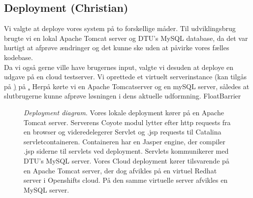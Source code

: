 \subsection*{Deployment (Christian)}
Vi valgte at deploye vores system på to forskellige måder. Til udviklingsbrug
brugte vi en lokal Apache Tomcat server og DTU's MySQL database, da det var
hurtigt at afprøve ændringer og det kunne ske uden at påvirke vores fælles
kodebase.\\
Da vi også gerne ville have brugernes input, valgte vi desuden at deploye en
udgave på en cloud testserver. Vi oprettede et virtuelt serverinstance (kan
tilgås på \href{http://rtgrek-area51.rhcloud.com/}) på \href{www.openshift.com}.
Herpå kørte vi en Apache Tomcatserver og en mySQL server, således at
slutbrugerne kunne afprøve løsningen i dens aktuelle udformning.
FloatBarrier
\begin{figure}[h]
\centering
{}
\caption{\emph{Deployment diagram}. Vores lokale deployment kører på en Apache
Tomcat server. Serverens Coyote modul lytter efter http requests fra en browser
og videredelegerer Servlet og .jsp requests til Catalina servletcontaineren.
Containeren har en Jasper engine, der compiler .jsp siderne til servlets ved
deployment. Servlets kommunikerer med DTU's MySQL server. Vores Cloud deployment
kører tilsvarende på en Apache Tomcat server, der dog afvikles på en virtuel
Redhat server i Openshifts cloud. På den samme virtuelle server afvikles en
MySQL server. \label{deployment_diagram}}
\end{figure}
\FloatBarrier